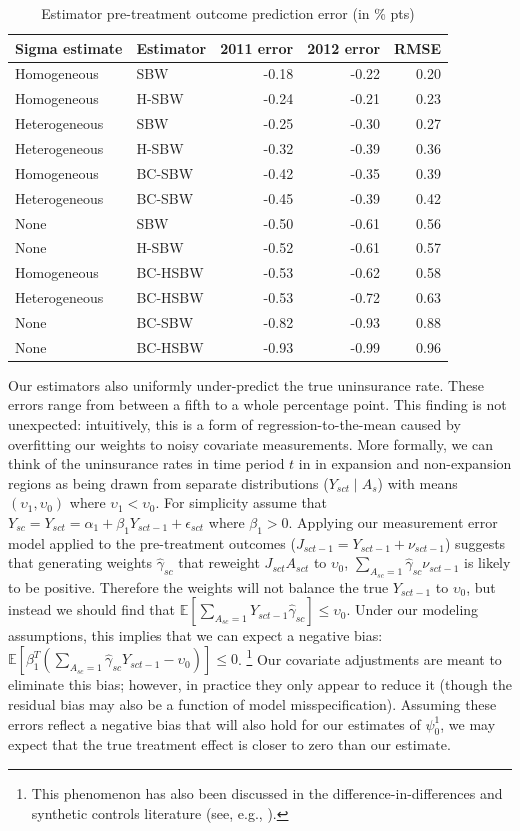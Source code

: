 \documentclass[aoas]{imsart}
\theoremstyle{plain}
\theoremstyle{remark}
\begin{document}
\begin{table}[ht]
\caption{Estimator
pre-treatment outcome prediction error (in \% pts)}\label{tab:pretxpred}
\begin{tabular}{llrrr}
  \hline
Sigma estimate & Estimator & 2011 error & 2012 error & RMSE \\ 
  \hline
Homogeneous & SBW & -0.18 & -0.22 & 0.20 \\ 
  Homogeneous & H-SBW & -0.24 & -0.21 & 0.23 \\ 
  Heterogeneous & SBW & -0.25 & -0.30 & 0.27 \\ 
  Heterogeneous & H-SBW & -0.32 & -0.39 & 0.36 \\ 
  Homogeneous & BC-SBW & -0.42 & -0.35 & 0.39 \\ 
  Heterogeneous & BC-SBW & -0.45 & -0.39 & 0.42 \\ 
  None & SBW & -0.50 & -0.61 & 0.56 \\ 
  None & H-SBW & -0.52 & -0.61 & 0.57 \\ 
  Homogeneous & BC-HSBW & -0.53 & -0.62 & 0.58 \\ 
  Heterogeneous & BC-HSBW & -0.53 & -0.72 & 0.63 \\ 
  None & BC-SBW & -0.82 & -0.93 & 0.88 \\ 
  None & BC-HSBW & -0.93 & -0.99 & 0.96 \\ 
   \hline
\end{tabular}
\end{table}

Our estimators also uniformly under-predict the true uninsurance rate. These errors range from between a fifth to a whole percentage point. This finding is not unexpected: intuitively, this is a form of regression-to-the-mean caused by overfitting our weights to noisy covariate measurements. More formally, we can think of the uninsurance rates in time period $t$ in in expansion and non-expansion regions as being drawn from separate distributions ($Y_{sct} \mid A_s$) with means $(\upsilon_1, \upsilon_0)$ where $\upsilon_1 < \upsilon_0$. For simplicity assume that $Y_{sc} = Y_{sct} = \alpha_1 + \beta_1Y_{sct-1} + \epsilon_{sct}$ where $\beta_1 > 0$. Applying our measurement error model applied to the pre-treatment outcomes ($J_{sct-1} = Y_{sct-1} + \nu_{sct-1}$) suggests that generating weights $\hat{\gamma}_{sc}$ that reweight $J_{sct}A_{sct}$ to $\upsilon_0$, $\sum_{A_{sc} = 1}\hat{\gamma}_{sc}\nu_{sct-1}$ is likely to be positive. Therefore the weights will not balance the true $Y_{sct-1}$ to $\upsilon_0$, but instead we should find that $\mathbb{E}[\sum_{A_{sc} = 1}Y_{sct-1}\hat{\gamma}_{sc}] \le \upsilon_0$. Under our modeling assumptions, this implies that we can expect a negative bias: $\mathbb{E}[\beta_1^T(\sum_{A_{sc} = 1}\hat{\gamma}_{sc}Y_{sct-1} - \upsilon_0)] \le 0$. \footnote{This phenomenon has also been discussed in the difference-in-differences and synthetic controls literature (see, e.g., \cite{daw2018matching}).} 
Our covariate adjustments are meant to eliminate this bias; however, in practice they only appear to reduce it (though the residual bias may also be a function of model misspecification). Assuming these errors reflect a negative bias that will also hold for our estimates of $\psi^1_0$, we may expect that the true treatment effect is closer to zero than our estimate. 
\end{document}
